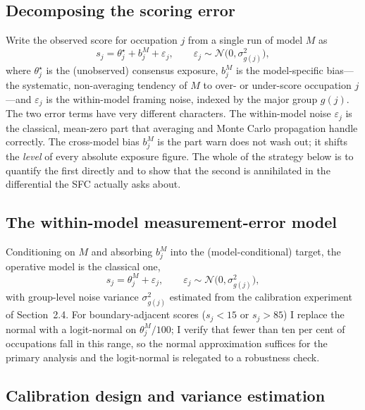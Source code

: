 \subsection{Decomposing the scoring error}

Write the observed score for occupation $j$ from a single run of model $M$ as
\begin{equation}
s_j = \theta^{\star}_j + b^{M}_j + \varepsilon_j,
\qquad
\varepsilon_j\sim\mathcal{N}\!\big(0,\sigma^2_{g(j)}\big),
\label{eq:decomp}
\end{equation}
where $\theta^{\star}_j$ is the (unobserved) consensus exposure, $b^{M}_j$ is the model-specific bias---the systematic, non-averaging tendency of $M$ to over- or under-score occupation $j$---and $\varepsilon_j$ is the within-model framing noise, indexed by the major group $g(j)$. The two error terms have very different characters. The within-model noise $\varepsilon_j$ is the classical, mean-zero part that averaging and Monte Carlo propagation handle correctly. The cross-model bias $b^{M}_j$ is the part \citet{yin2026} warn does not wash out; it shifts the \emph{level} of every absolute exposure figure. The whole of the strategy below is to quantify the first directly and to show that the second is annihilated in the differential the SFC actually asks about.

\subsection{The within-model measurement-error model}

Conditioning on $M$ and absorbing $b^M_j$ into the (model-conditional) target, the operative model is the classical one,
\begin{equation}
s_j=\theta^{M}_j+\varepsilon_j,\qquad \varepsilon_j\sim\mathcal{N}\big(0,\sigma^2_{g(j)}\big),
\end{equation}
with group-level noise variance $\sigma^2_{g(j)}$ estimated from the calibration experiment of Section~2.4. For boundary-adjacent scores ($s_j<15$ or $s_j>85$) I replace the normal with a logit-normal on $\theta^M_j/100$; I verify that fewer than ten per cent of occupations fall in this range, so the normal approximation suffices for the primary analysis and the logit-normal is relegated to a robustness check.

\subsection{Calibration design and variance estimation}

